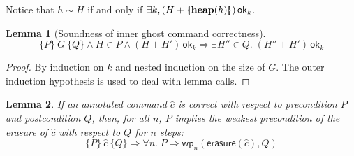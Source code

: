 \documentclass{article}
\newtheorem{lemma}{Lemma}
\newcommand{\llbrace}{\{\hspace{-3pt}[}
\newcommand{\rrbrace}{]\hspace{-3pt}\}}
\begin{document}
Notice that $h \sim H$ if and only if $\exists k, (H + \llbrace\mathbf{heap}(h)\rrbrace)\,\mathsf{ok}_k$.

\begin{lemma}[Soundness of inner ghost command correctness]\label{lem:G-sound}
$$\{P\}\ G\ \{Q\} \land H \in P \land (H + H')\,\mathsf{ok}_k \Rightarrow \exists H'' \in Q.\; (H'' + H')\,\mathsf{ok}_k$$
\end{lemma}
\begin{proof}
By induction on $k$ and nested induction on the size of $G$. The outer induction hypothesis is used to deal with lemma calls.
\end{proof}

\begin{lemma}
If an annotated command $\hat{c}$ is correct with respect to precondition $P$ and postcondition $Q$, then, for all $n$, $P$ implies the weakest precondition of the erasure of $\hat{c}$ with respect to $Q$ for $n$ steps:
$$\{P\}\ \hat{c}\ \{Q\} \Rightarrow \forall n.\;P \Rightarrow \mathsf{wp}_n(\mathsf{erasure}(\hat{c}), Q)$$
\end{lemma}
\end{document}
